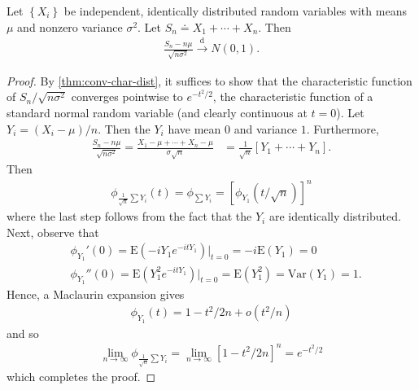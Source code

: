 \begin{theorem}\label{thm:central-limit}
	Let $ \left\{ X_{i} \right\}$ be independent, identically
	distributed random variables with means $\mu$ and nonzero
	variance $\sigma^{2}$. Let $S_{n} \doteq X_{1} + \cdots + X_{n}$. Then
	\begin{equation*}
		\begin{split}
			\frac{S_{n} - n \mu}{\sqrt{n \sigma^{2}}} \xrightarrow{\text{d}} N(0,1).
		\end{split}
	\end{equation*}
\end{theorem}
\begin{proof}
	By \cref{thm:conv-char-dist}, it suffices to show that
	the characteristic function of $S_{n}/\sqrt{n \sigma^{2}}$ converges
	pointwise to  $e^{-t^{2}/2}$, the characteristic function of 
	a standard normal random variable (and clearly
	continuous at $t=0$). Let
	$Y_{i} = (X_{i} - \mu)/n$. Then the $Y_{i}$ have mean $0$ and
	variance $1$. Furthermore, 
	\begin{equation*}
		\begin{split}
			\frac{S_{n} - n \mu}{\sqrt{n \sigma^{2}}}
			= \frac{X_{1} - \mu+ \cdots + X_{n} - \mu}{\sigma \sqrt{n}}
			& = \frac{1}{\sqrt{n}}\left[ Y_{1} + \cdots + Y_{n} \right].
		\end{split}
	\end{equation*}
	Then
	\begin{equation*}
		\begin{split}
			\phi_{\frac{1}{\sqrt{n}}\sum Y_{i}}(t)
			= \phi_{\sum Y_{i}} = \left[ \phi_{Y_{1}}\left( t/\sqrt{n} \right) \right]^{n}
		\end{split}
	\end{equation*}
	where the last step follows from the fact that the $Y_{i}$ are identically
	distributed. Next, observe that
	\begin{equation*}
		\begin{split}
			& \phi_{Y_{1}}'(0) = \mathrm{E} (-iY_{1} e^{-itY_{1}}) \vert_{t = 0} = -i
			\mathrm{E}(Y_{1}) = 0
			\\
			& \phi_{Y_{1}}''(0) = \mathrm{E}(Y_{1}^{2} e^{-itY_{1}}) \vert_{t = 0} = 
			\mathrm{E}(Y_{1}^{2}) = \mathrm{Var}(Y_{1}) = 1.
		\end{split}
	\end{equation*}
	Hence, a Maclaurin expansion gives
	\begin{equation*}
		\begin{split}
			\phi_{Y_{1}}(t) = 1 - t^{2}/2n + o(t^{2}/n)
		\end{split}
	\end{equation*}
	and so
	\begin{equation*}
		\begin{split}
			\lim_{n \to \infty} \phi_{\frac{1}{\sqrt{n}} \sum Y_{i}}
			= \lim_{n \to \infty} \left[ 1 - t^{2}/2n \right]^{n}
			= e^{-t^{2}/2}
		\end{split}
	\end{equation*}
	which completes the proof.
\end{proof}